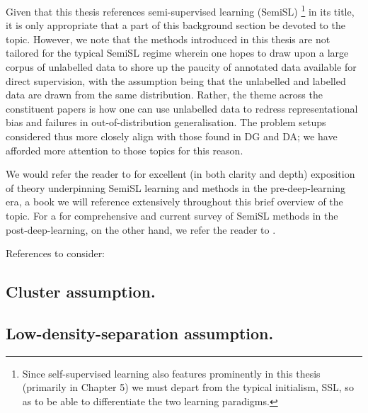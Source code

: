 Given that this thesis references semi-supervised learning (SemiSL)
\footnote{
Since self-supervised learning also features prominently in this thesis (primarily in Chapter 5) we
must depart from the typical initialism, SSL, so as to be able to differentiate the two learning
paradigms.
}
in its title, it is only appropriate that a part of this background section be devoted to the
topic.
%
However, we note that the methods introduced in this thesis are not tailored for the typical SemiSL
regime wherein one hopes to draw upon a large corpus of unlabelled data to shore up the paucity of
annotated data available for direct supervision, with the assumption being that the unlabelled and
labelled data are drawn from the same distribution.
%
Rather, the theme across the constituent papers is how one can use unlabelled data to redress
representational bias and failures in out-of-distribution generalisation. 
%
The problem setups considered thus more closely align with those found in DG and DA; we have
afforded more attention to those topics for this reason.

We would refer the reader to \cite{chapelle2009semi} for excellent (in both clarity and depth)
exposition of theory underpinning SemiSL learning and methods in the pre-deep-learning era, a book
we will reference extensively throughout this brief overview of the topic.
%
For a for comprehensive and current survey of SemiSL methods in the post-deep-learning, on the
other hand, we refer the reader to \cite{yang2022survey}.

%
References to consider:
\cite{chapelle2009semi, scholkopf2021toward, lienen2021credal, sohn2020fixmatch, tarvainen2017mean,
blum1998combining, gong2021alphamatch}
%

\subsection{Cluster assumption.}\label{ssec:cluster-assumption}
%
\subsection{Low-density-separation assumption.}\label{ssec:lds-assumption}
%
